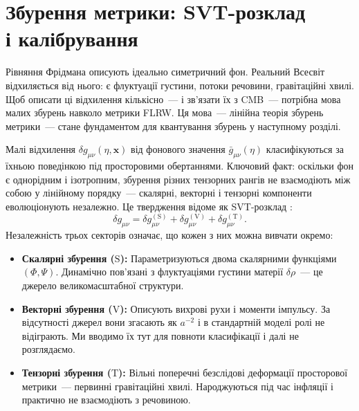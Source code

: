
\chapter{Збурення метрики: SVT-розклад\\ і калібрування}
\label{sec:metric}

Рівняння Фрідмана описують ідеально симетричний фон.
Реальний Всесвіт відхиляється від нього: є флуктуації густини,
потоки речовини, гравітаційні хвилі. Щоб описати ці відхилення
кількісно~--- і зв'язати їх з CMB~--- потрібна мова малих збурень
навколо метрики FLRW. Ця мова~--- лінійна теорія збурень метрики~---
стане фундаментом для квантування збурень у наступному розділі.

Малі відхилення $\delta g_{\mu\nu}(\eta, \mathbf{x})$ від
фонового значення $\bar{g}_{\mu\nu}(\eta)$ класифікуються за
їхньою поведінкою під просторовими обертаннями. Ключовий факт:
оскільки фон є однорідним і ізотропним, збурення різних
тензорних рангів не взаємодіють між собою у лінійному порядку~---
скалярні, векторні і тензорні компоненти еволюціонують
незалежно. Це твердження відоме як SVT-розклад
\cite{stewart_walker_1974}:
\begin{equation}\label{eq:svt_decomposition}
  \delta g_{\mu\nu}
    = \delta g_{\mu\nu}^{(\mathrm{S})}
    + \delta g_{\mu\nu}^{(\mathrm{V})}
    + \delta g_{\mu\nu}^{(\mathrm{T})}.
\end{equation}
Незалежність трьох секторів означає, що кожен з них можна
вивчати окремо:
\begin{itemize}
  \item \textbf{Скалярні збурення ($\mathrm{S}$):}
        Параметризуються двома скалярними функціями
        $(\Phi, \Psi)$. Динамічно пов'язані з флуктуаціями
        густини матерії $\delta\rho$~--- це джерело
        великомасштабної структури.
  \item \textbf{Векторні збурення ($\mathrm{V}$):}
        Описують вихрові рухи і моменти імпульсу. За
        відсутності джерел вони згасають як $a^{-2}$
        \cite{mukhanov_2005} і в стандартній моделі ролі не
        відіграють. Ми вводимо їх тут для повноти
        класифікації і далі не розглядаємо.
  \item \textbf{Тензорні збурення ($\mathrm{T}$):}
        Вільні поперечні безслідові деформації просторової
        метрики~--- первинні гравітаційні хвилі. Народжуються
        під час інфляції і практично не взаємодіють з
        речовиною.
\end{itemize}

